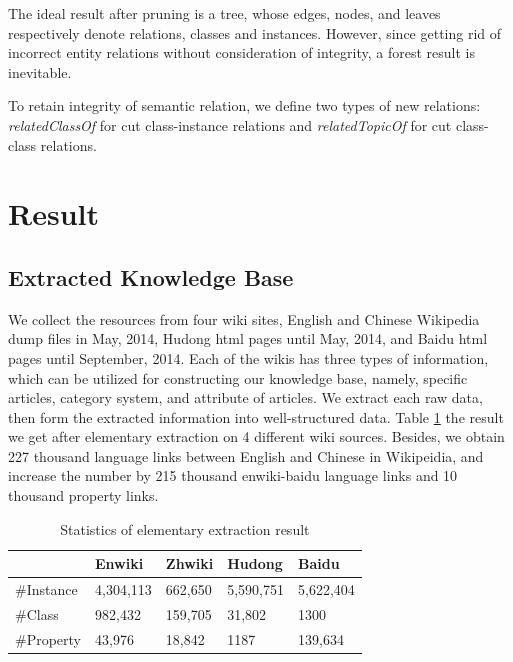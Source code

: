 \documentclass[runningheads,a4paper]{llncs}
\begin{document}
The ideal result after pruning is a tree, whose edges, nodes, and leaves respectively denote relations, classes and instances. However, since getting rid of incorrect entity relations without consideration of integrity, a forest result is inevitable.

To retain integrity of semantic relation, we define two types of new relations: \textit{relatedClassOf} for cut class-instance relations and \textit{relatedTopicOf} for cut class-class relations. 

\section{Result}
\label{sec:result}

\subsection{Extracted Knowledge Base}
We collect the resources from four wiki sites, English and Chinese Wikipedia dump files in May, 2014, Hudong html pages until May, 2014, and Baidu html pages until September, 2014. Each of the wikis has three types of information, which can be utilized for constructing our knowledge base, namely, specific articles, category system, and attribute of articles. We extract each raw data, then form the extracted information into well-structured data. Table \ref{tab:extract-result} the result we get after elementary extraction on 4 different wiki sources. Besides, we obtain 227 thousand language links between English and Chinese in Wikipeidia, and increase the number by 215 thousand enwiki-baidu language links and 10 thousand property links.
\vspace{-0.5cm}
\begin{table}[hb]
    \small
    \centering
    \caption{Statistics of elementary extraction result}
    \label{tab:extract-result}
        \begin{tabular}{|l|l|l|l|l|}
            \hline
                       & Enwiki    & Zhwiki   & Hudong    & Baidu     \\ \hline
            \#Instance & 4,304,113 & 662,650  & 5,590,751 & 5,622,404 \\ \hline
            \#Class    & 982,432   & 159,705  & 31,802    & 1300      \\ \hline
            \#Property & 43,976    & 18,842   & 1187      & 139,634   \\ \hline
        \end{tabular}
\end{table}
\end{document}
